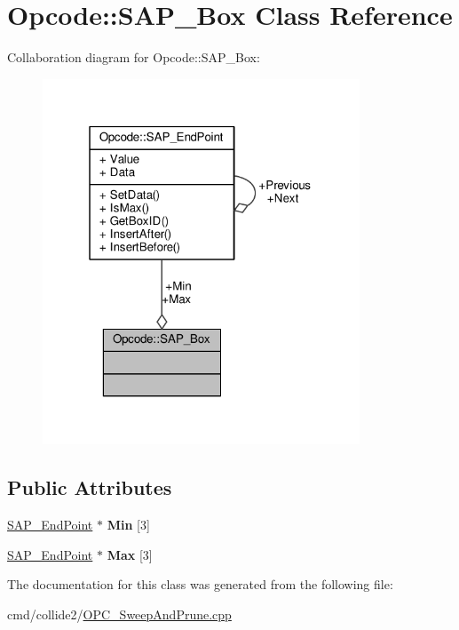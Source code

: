 \hypertarget{classOpcode_1_1SAP__Box}{}\section{Opcode\+:\+:S\+A\+P\+\_\+\+Box Class Reference}
\label{classOpcode_1_1SAP__Box}


Collaboration diagram for Opcode\+:\+:S\+A\+P\+\_\+\+Box\+:
\nopagebreak
\begin{figure}[H]
\begin{center}
\leavevmode
\includegraphics[width=268pt]{d1/d8b/classOpcode_1_1SAP__Box__coll__graph}
\end{center}
\end{figure}
\subsection*{Public Attributes}
\begin{DoxyCompactItemize}
\item 
\hyperlink{classOpcode_1_1SAP__EndPoint}{S\+A\+P\+\_\+\+End\+Point} $\ast$ {\bfseries Min} \mbox{[}3\mbox{]}\hypertarget{classOpcode_1_1SAP__Box_a5b78918680c5100afc3f1a9ea21ffc9d}{}\label{classOpcode_1_1SAP__Box_a5b78918680c5100afc3f1a9ea21ffc9d}

\item 
\hyperlink{classOpcode_1_1SAP__EndPoint}{S\+A\+P\+\_\+\+End\+Point} $\ast$ {\bfseries Max} \mbox{[}3\mbox{]}\hypertarget{classOpcode_1_1SAP__Box_a5e1d6e60a226f3a8db2da654d7a85546}{}\label{classOpcode_1_1SAP__Box_a5e1d6e60a226f3a8db2da654d7a85546}

\end{DoxyCompactItemize}


The documentation for this class was generated from the following file\+:\begin{DoxyCompactItemize}
\item 
cmd/collide2/\hyperlink{OPC__SweepAndPrune_8cpp}{O\+P\+C\+\_\+\+Sweep\+And\+Prune.\+cpp}\end{DoxyCompactItemize}
